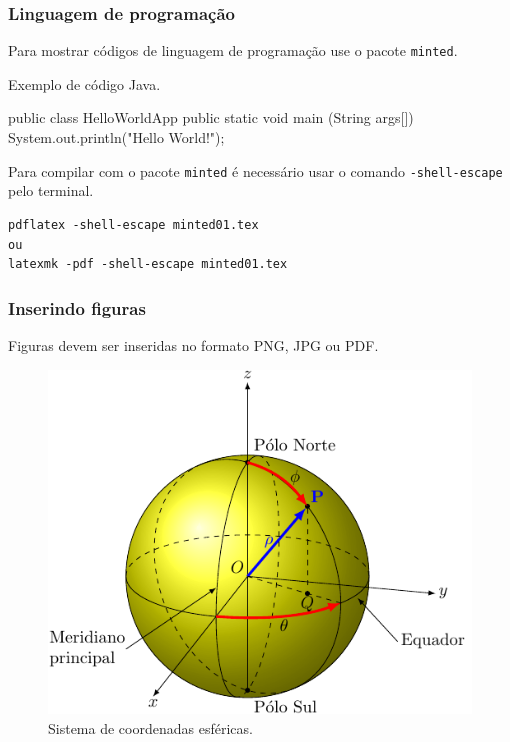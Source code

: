 \documentclass[aspectratio=169]{beamer}
\theoremstyle{Definition}
\begin{document}
\begin{frame}[fragile]\frametitle{Linguagem de programa\c c\~ao}
Para mostrar c\'odigos de linguagem de programa\c c\~ao use o pacote \verb|minted|.

Exemplo de c\'odigo Java.

\begin{javacode}
public class HelloWorldApp {
    public static void main (String args[])
    {
      System.out.println("Hello World!");
    }
}
\end{javacode}

Para compilar com o pacote \verb|minted| \'e necess\'ario usar o comando \verb|-shell-escape| pelo terminal.

\begin{verbatim}
pdflatex -shell-escape minted01.tex
ou
latexmk -pdf -shell-escape minted01.tex
\end{verbatim}
\end{frame}

\begin{frame}\frametitle{Inserindo figuras}
Figuras devem ser inseridas no formato PNG, JPG ou PDF.

  \begin{figure}[h]
    \centering
    \includegraphics[height=0.6\paperheight]{fig/figCoordEsf02}
    \caption{Sistema de coordenadas esf\'ericas.}\label{figCoordEsf02}
  \end{figure}
\end{frame}
\end{document}
